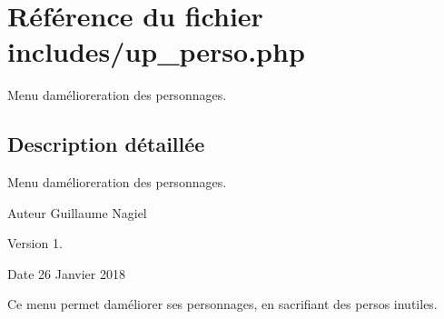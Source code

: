 \hypertarget{up__perso_8php}{}\section{Référence du fichier includes/up\+\_\+perso.php}
\label{up__perso_8php}


Menu d\textquotesingle{}amélioreration des personnages.  




\subsection{Description détaillée}
Menu d\textquotesingle{}amélioreration des personnages. 

\begin{DoxyAuthor}{Auteur}
Guillaume Nagiel 
\end{DoxyAuthor}
\begin{DoxyVersion}{Version}
1. 
\end{DoxyVersion}
\begin{DoxyDate}{Date}
26 Janvier 2018
\end{DoxyDate}
Ce menu permet d\textquotesingle{}améliorer ses personnages, en sacrifiant des persos inutiles. 